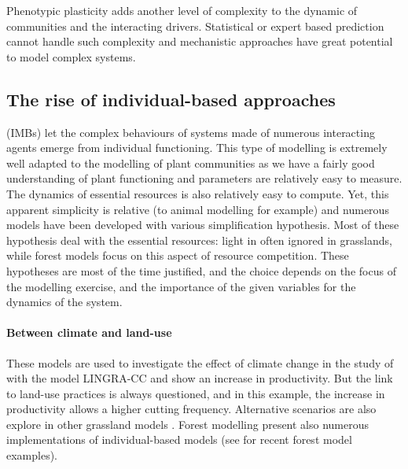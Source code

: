 Phenotypic plasticity adds another level of complexity to the dynamic of communities and the interacting drivers. Statistical or expert based prediction cannot handle such complexity and mechanistic approaches have great potential to model complex systems.




\subsection{The rise of individual-based approaches}


 (IMBs) let the complex behaviours of systems made of numerous interacting agents emerge from individual functioning. This type of modelling is extremely well adapted to the modelling of plant communities as we have a fairly good understanding of plant functioning and parameters are relatively easy to measure. The dynamics of essential resources is also relatively easy to compute. Yet, this apparent simplicity is relative (to animal modelling for example) and numerous models have been developed with various simplification hypothesis. Most of these hypothesis deal with the essential resources: light in often ignored in grasslands, while forest models focus on this aspect of resource competition. These hypotheses are most of the time justified, and the choice depends on the focus of the modelling exercise, and the importance of the given variables for the dynamics of the system.

\paragraph{Between climate and land-use}
These models are used to investigate the effect of climate change in the study of \cite{rodriguez_lingra-cc:_1999} with the model LINGRA-CC and show an increase in productivity. But the link to land-use practices is always questioned, and in this example, the increase in productivity allows a higher cutting frequency. Alternative scenarios are also explore in other grassland models \cite{taubert_review_2012, taubert_modelling_2014, maire_plasticity_2013, maire_trade-off_2009}. Forest modelling present also numerous implementations of individual-based models (see \cite{ falster_plant:_2016, marechaux_individual-based_2017} for recent forest model examples).

